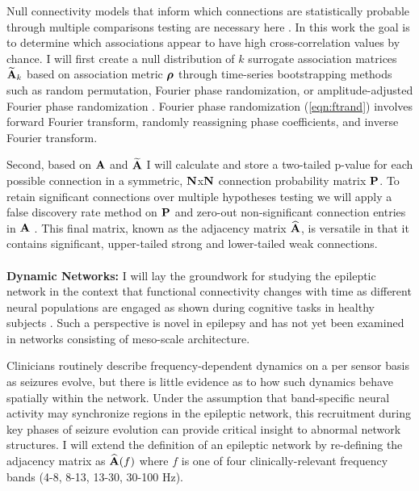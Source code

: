Null connectivity models that inform which connections are statistically probable through multiple comparisons testing are necessary here \cite{bassett2013robust}. In this work the goal is to determine which associations appear to have high cross-correlation values by chance. I will first create a null distribution of $k$ surrogate association matrices $\widetilde{\mathbf{\displaystyle A}}_k$ based on association metric $\boldsymbol{\displaystyle \rho}$ through time-series bootstrapping methods such as random permutation, Fourier phase randomization, or amplitude-adjusted Fourier phase randomization \cite{bassett2013robust}. Fourier phase randomization (\ref{eqn:ftrand}) involves forward Fourier transform, randomly reassigning phase coefficients, and inverse Fourier transform.

Second, based on $\mathbf{\displaystyle A}$ and $\widetilde{\mathbf{\displaystyle A}}$ I will calculate and store a two-tailed p-value for each possible connection in a symmetric, $\mathbf{\displaystyle N}$x$\mathbf{\displaystyle N}$ connection probability matrix $\mathbf{\displaystyle P}$. To retain significant connections over multiple hypotheses testing we will apply a false discovery rate method on $\mathbf{\displaystyle P}$ and zero-out non-significant connection entries in $\mathbf{\displaystyle A}$ \cite{benjamini2001control}. This final matrix, known as the adjacency matrix $\widehat{\mathbf{\displaystyle A}}$, is versatile in that it contains significant, upper-tailed strong and lower-tailed weak connections.
~\\
~\\
\textbf{Dynamic Networks:}
I will lay the groundwork for studying the epileptic network in the context that functional connectivity changes with time as different neural populations are engaged as shown during cognitive tasks in healthy subjects \cite{bassett2011dynamic}. Such a perspective is novel in epilepsy and has not yet been examined in networks consisting of meso-scale architecture.

Clinicians routinely describe frequency-dependent dynamics on a per sensor basis as seizures evolve, but there is little evidence as to how such dynamics behave spatially within the network. Under the assumption that band-specific neural activity may synchronize regions in the epileptic network, this recruitment during key phases of seizure evolution can provide critical insight to abnormal network structures. I will extend the definition of an epileptic network by re-defining the adjacency matrix as $\widehat{\mathbf{\displaystyle A}}(f)$ where $f$ is one of four clinically-relevant frequency bands (4-8, 8-13, 13-30, 30-100 Hz).

